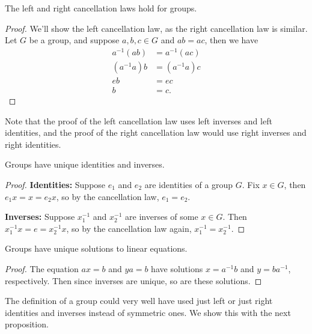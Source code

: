 \documentclass[10pt]{report}
\begin{document}
\begin{prop}
	The left and right cancellation laws hold for groups.
\end{prop}
\begin{proof}
	We'll show the left cancellation law, as the right cancellation law is similar. Let $G$ be a group, and suppose $a,b,c \in G$ and $ab = ac$, then we have
\begin{align*}
	a^{-1} (ab) &= a^{-1} (ac) \\
	(a^{-1} a) b &= (a^{-1} a) c \\
	e b &= e c \\
	b &= c.
\end{align*}
\end{proof}

Note that the proof of the left cancellation law uses left inverses and left identities, and the proof of the right cancellation law would use right inverses and right identities.

\begin{prop}
	Groups have unique identities and inverses.
\end{prop}
\begin{proof}
	\textbf{Identities:} Suppose $e_1$ and $e_2$ are identities of a group $G$. Fix $x \in G$, then $e_1 x = x = e_2 x$, so by the cancellation law, $e_1=e_2$.

	\textbf{Inverses:} Suppose $x_1^{-1}$ and $x_2^{-1}$ are inverses of some $x \in G$. Then $x_1^{-1}x=e=x_2^{-1}x$, so by the cancellation law again, $x_1^{-1}=x_2^{-1}$.
\end{proof}

\begin{prop}
	Groups have unique solutions to linear equations.
\end{prop}
\begin{proof}
	The equation $ax=b$ and $ya=b$ have solutions $x=a^{-1}b$ and $y=ba^{-1}$, respectively. Then since inverses are unique, so are these solutions.
\end{proof}

\begin{note}{}{}
	The definition of a group could very well have used just left or just right identities and inverses instead of symmetric ones. We show this with the next proposition.
\end{note}
\end{document}
